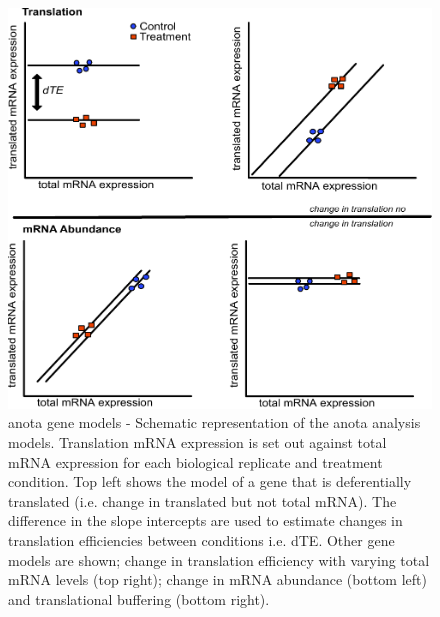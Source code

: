 \documentclass[
  12pt,
  openany]{book}
\begin{document}
\begin{figure}
  \includegraphics{./figures/geneModes_anota_Larsson.pdf}
  \caption{anota gene models - Schematic representation of the anota analysis models. Translation mRNA expression is set out against total mRNA expression for each biological replicate and treatment condition. Top left shows the model of a gene that is deferentially translated (i.e. change in translated but not total mRNA). The difference in the slope intercepts are used to estimate changes in translation efficiencies between conditions i.e. dTE. Other gene models are shown; change in translation efficiency with varying total mRNA levels (top right); change in mRNA abundance (bottom left) and translational buffering (bottom right).
  \label{fig:anota}}
\end{figure}
\end{document}
